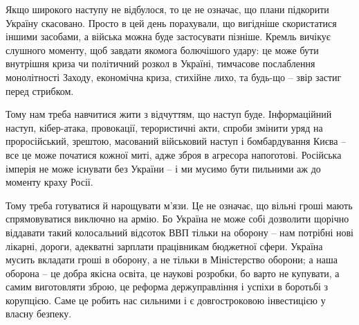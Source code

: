 Якщо широкого наступу не відбулося, то це не означає, що плани підкорити
Україну скасовано. Просто в цей день порахували, що вигідніше скористатися
іншими засобами, а війська можна буде застосувати пізніше. Кремль вичікує
слушного моменту, щоб завдати якомога болючішого удару: це може бути внутрішня
криза чи політичний розкол в Україні, тимчасове послаблення монолітності
Заходу, економічна криза, стихійне лихо, та будь-що – звір застиг перед
стрибком.

Тому нам треба навчитися жити з відчуттям, що наступ буде. Інформаційний
наступ, кібер-атака, провокації, терористичні акти, спроби змінити уряд на
проросійський, зрештою, масований військовий наступ і бомбардування Києва – все
це може початися кожної миті, адже зброя в агресора напоготові. Російська
імперія не може існувати без України – і ми мусимо бути пильними аж до моменту
краху Росії.

Тому треба готуватися й нарощувати м’язи. Це не означає, що вільні гроші мають
спрямовуватися виключно на армію. Бо Україна не може собі дозволити щорічно
віддавати такий колосальний відсоток ВВП тільки на оборону – нам потрібні нові
лікарні, дороги, адекватні зарплати працівникам бюджетної сфери. Україна мусить
вкладати гроші в оборону, а не тільки в Міністерство оборони; а наша оборона –
це добра якісна освіта, це наукові розробки, бо варто не купувати, а самим
виготовляти зброю, це реформа держуправління і успіхи в боротьбі з корупцією.
Саме це робить нас сильними і є довгостроковою інвестицією у власну безпеку.

